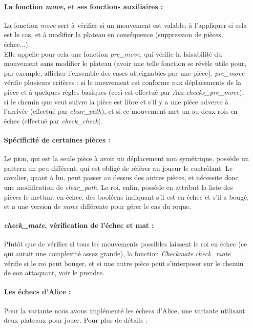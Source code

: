 \documentclass[a4paper]{article}
\begin{document}
\paragraph{La fonction \textit{move}, et ses fonctions auxiliaires :} La fonction \textit{move} sert à vérifier si un mouvement est valable, à l'appliquer si cela est le cas, et à modifier la plateau en conséquence (suppression de pièces, échec...). \\

Elle appelle pour cela une fonction \textit{pre\_move}, qui vérifie la faisabilité du mouvement sans modifier le plateau (avoir une telle fonction se révèle utile pour, par exemple, afficher l'ensemble des cases atteignables par une pièce).
\textit{pre\_move} vérifie plusieurs critères : si le mouvement est conforme aux déplacements de la pièce et à quelques règles basiques (ceci est effectué par \textit{Aux.checks\_pre\_move}), si le chemin que veut suivre la pièce est libre et s'il y a une pièce adverse à l'arrivée (effectué par \textit{clear\_path}), et si ce mouvement met un ou deux rois en échec (effectué par \textit{check\_check}).

\paragraph{Spécificité de certaines pièces :} Le pion, qui est la seule pièce à avoir un déplacement non symétrique, possède un pattern un peu différent, qui est obligé de référer au joueur le contrôlant.
Le cavalier, quant à lui, peut passer au dessus des autres pièces, et nécessite donc une modification de \textit{clear\_path}.
Le roi, enfin, possède en attribut la liste des pièces le mettant en échec, des booléens indiquant s'il est en échec et s'il a bougé, et a une version de \textit{move} différente pour gérer le cas du roque. 

\paragraph{\textit{check\_mate}, vérification de l'échec et mat :} Plutôt que de vérifier si tous les mouvements possibles laissent le roi en échec (ce qui aurait une complexité assez grande), la fonction \textit{Checkmate.check\_mate} vérifie si le roi peut bouger, et si une autre pièce peut s'interposer sur le chemin de son attaquant, voir le prendre.

\paragraph{Les échecs d'Alice :}Pour la variante nous avons implémenté les échecs d'Alice, une variante utilisant deux plateaux pour jouer. Pour plus de détails : 
\end{document}
